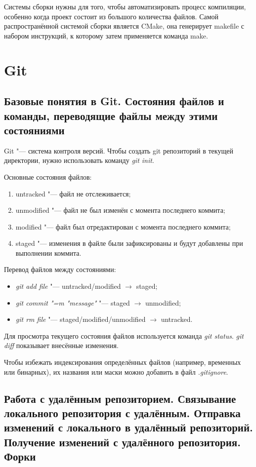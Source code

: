 \documentclass[12pt]{article}
\begin{document}
Системы сборки нужны для того, чтобы автоматизировать процесс компиляции, особенно когда проект состоит из большого количества файлов. Самой распространённой системой сборки является CMake, она генерирует makefile с набором инструкций, к которому затем применяется команда make.

\section{Git}

\subsection{Базовые понятия в Git. Состояния файлов и команды, переводящие файлы между этими состояниями}
Git "--- система контроля версий. Чтобы создать git репозиторий в текущей директории, нужно использовать команду \textit{git init}.

Основные состояния файлов:
\begin{enumerate}
\item untracked "--- файл не отслеживается;
\item unmodified "--- файл не был изменён с момента последнего коммита;
\item modified "--- файл был отредактирован с момента последнего коммита;
\item staged "--- изменения в файле были зафиксированы и будут добавлены при выполнении коммита.
\end{enumerate}

Перевод файлов между состояниями:
\begin{itemize}
\item \textit{git add file} "--- untracked/modified $\rightarrow$ staged;
\item \textit{git commit "=m "message"} "--- staged $\rightarrow$ unmodified;
\item \textit{git rm file} "--- staged/modified/unmodified $\rightarrow$ untracked.
\end{itemize}

Для просмотра текущего состояния файлов используется команда \textit{git status}. \textit{git diff} показывает внесённые изменения.

Чтобы избежать индексирования определённых файлов (например, временных или бинарных), их названия или маски можно добавить в файл \textit{.gitignore}. 

\subsection{Работа с удалённым репозиторием. Связывание локального репозитория с удалённым. Отправка изменений с локального в удалённый репозиторий. Получение изменений с удалённого репозитория. Форки}
\end{document}
